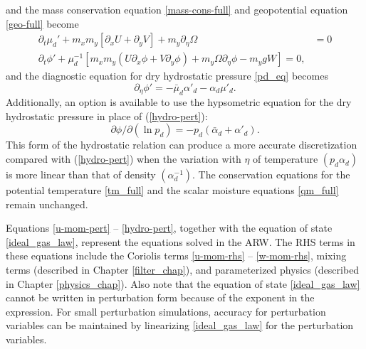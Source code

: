 %
and the mass conservation equation \eqref{mass-cons-full}
and geopotential equation \eqref{geo-full} become
%
\begin{align}
\partial_t  \mu_d' + m_x m_y[\partial_x U + \partial_y V] + m_y
\partial_\eta \Omega
& = 0 \\
%
\partial_t \phi' 
+ \mu_d^{-1}
[m_x m_y (U\partial_x\phi + V\partial_y\phi) + m_y
\Omega\partial_\eta\phi -m_y gW ] = 0,
\label{phi_pert}
%
\end{align}
%
\noindent
and the diagnostic equation for dry hydrostatic pressure \eqref{pd_eq} becomes
%
\begin{equation}
\partial_\eta \phi' =-\bar\mu_d \alpha'_d-\alpha_d\mu'_d.
\label{hydro-pert}
\end{equation}
%
Additionally, an option is available to use the hypsometric equation for the dry hydrostatic pressure in place of (\ref{hydro-pert}):
\begin{equation}
{\partial \phi / \partial (\ln p_d)} = - p_d(\bar \alpha_d + \alpha'_d).
\label{hypsometric_eqn}
\end{equation}
%
This form of the hydrostatic relation can produce a more accurate discretization compared with (\ref{hydro-pert}) when the variation with $\eta$ of temperature 
$(p_d \alpha_d)$ is more linear than that of density $(\alpha_d^{-1})$.
The conservation equations for the potential temperature \eqref{tm_full} and 
the scalar moisture equations \eqref{qm_full} remain unchanged.

Equations \eqref{u-mom-pert} -- \eqref{hydro-pert},
together with the equation of state \eqref{ideal_gas_law},
represent the equations solved in the ARW.
The RHS terms in these equations include the
Coriolis terms \eqref{u-mom-rhs} -- \eqref{w-mom-rhs},
mixing terms (described in Chapter \ref{filter_chap}), and
parameterized physics (described in Chapter \ref{physics_chap}).  
Also note that the equation of state \eqref{ideal_gas_law} cannot be
written in perturbation form because of the exponent in the expression.
For small perturbation simulations, accuracy for perturbation variables
can be maintained by linearizing \eqref{ideal_gas_law} for the
perturbation variables.
%



